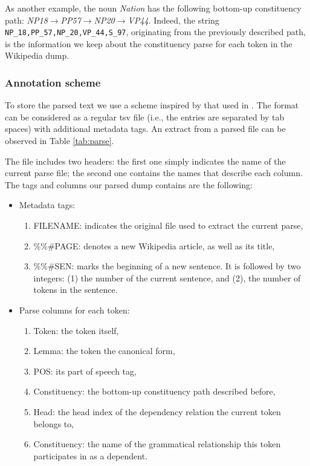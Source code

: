  


As another example, the noun \textit{Nation} has the following bottom-up constituency path: \textit{NP18}$\rightarrow$\textit{PP57}$\rightarrow$\textit{NP20}$\rightarrow $\textit{VP44}. Indeed, the string \texttt{NP\_18,PP\_57,NP\_20,VP\_44,S\_97}, originating from the previously described path,  is the information we keep about the constituency parse for each token in the Wikipedia dump.



\subsubsection{Annotation scheme}\label{section3.2}
To store the parsed text we use a scheme  inspired by that used in \cite{ATSERIAS08}. The format can be considered as a regular tsv file (i.e., the entries are separated by tab spaces) with additional metadata tags. An extract from a parsed file can be observed in Table \ref{tab:parse}. 

The file includes two headers: the first one simply indicates the name of the current parse file; the second one contains the names that describe each column. The tags and columns our parsed dump contains are the following:
\begin{itemize}
\item Metadata tags:
\begin{enumerate}
\item {FILENAME}: indicates the original file used to extract the current parse, 
\item {\%\%\#PAGE}: denotes a new Wikipedia article, as well as its title, 
\item {\%\%\#SEN}: marks the beginning of a new sentence. It is followed by two integers: (1) the number of the current sentence, and (2), the number of tokens in the sentence.

\end{enumerate}

\item Parse columns for each token:
\begin{enumerate}
\item Token: the token itself,
\item Lemma: the token the canonical form,
\item POS: its part of speech tag,
\item Constituency: the bottom-up constituency path described before,
\item Head: the head index of the dependency relation the current token belongs to,
\item Constituency: the name of the grammatical relationship this token participates in as a dependent.
\end{enumerate}
\end{itemize}

